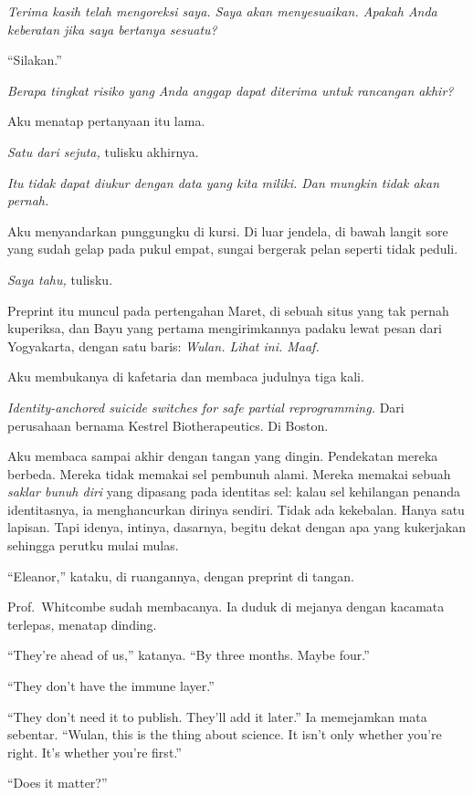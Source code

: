 \documentclass[11pt,twoside,openany]{book}
\makeatletter
\newcommand{\scenebreak}{\par\vspace{0.9em}{\centering\textsc{*\hspace{0.7em}*\hspace{0.7em}*}\par}\vspace{0.9em}\@afterindentfalse\@afterheading}
\makeatother
\begin{document}
\emph{Terima kasih telah mengoreksi saya. Saya akan menyesuaikan. Apakah Anda keberatan jika saya bertanya sesuatu?}

``Silakan.''

\emph{Berapa tingkat risiko yang Anda anggap dapat diterima untuk rancangan akhir?}

Aku menatap pertanyaan itu lama.

\emph{Satu dari sejuta,} tulisku akhirnya.

\emph{Itu tidak dapat diukur dengan data yang kita miliki. Dan mungkin tidak akan pernah.}

Aku menyandarkan punggungku di kursi. Di luar jendela, di bawah langit sore yang sudah gelap pada pukul empat, sungai bergerak pelan seperti tidak peduli.

\emph{Saya tahu,} tulisku.

\scenebreak
Preprint itu muncul pada pertengahan Maret, di sebuah situs yang tak pernah kuperiksa, dan Bayu yang pertama mengirimkannya padaku lewat pesan dari Yogyakarta, dengan satu baris: \emph{Wulan. Lihat ini. Maaf.}

Aku membukanya di kafetaria dan membaca judulnya tiga kali.

\emph{Identity-anchored suicide switches for safe partial reprogramming.} Dari perusahaan bernama Kestrel Biotherapeutics. Di Boston.

Aku membaca sampai akhir dengan tangan yang dingin. Pendekatan mereka berbeda. Mereka tidak memakai sel pembunuh alami. Mereka memakai sebuah \emph{saklar bunuh diri} yang dipasang pada identitas sel: kalau sel kehilangan penanda identitasnya, ia menghancurkan dirinya sendiri. Tidak ada kekebalan. Hanya satu lapisan. Tapi idenya, intinya, dasarnya, begitu dekat dengan apa yang kukerjakan sehingga perutku mulai mulas.

``Eleanor,'' kataku, di ruangannya, dengan preprint di tangan.

Prof.~Whitcombe sudah membacanya. Ia duduk di mejanya dengan kacamata terlepas, menatap dinding.

``They're ahead of us,'' katanya. ``By three months. Maybe four.''

``They don't have the immune layer.''

``They don't need it to publish. They'll add it later.'' Ia memejamkan mata sebentar. ``Wulan, this is the thing about science. It isn't only whether you're right. It's whether you're first.''

``Does it matter?''
\end{document}
